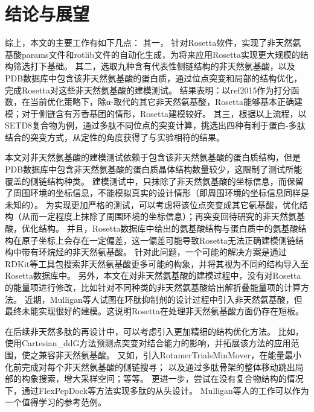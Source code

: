 
\chapter{结论与展望}


综上，本文的主要工作有如下几点：
其一， 针对Rosetta软件，实现了非天然氨基酸params文件和rotlib文件的自动化生成，为将来应用Rosetta实现更大规模的结构筛选打下基础。
其二，选取九种含有代表性侧链结构的非天然氨基酸，以及PDB数据库中包含该非天然氨基酸的蛋白质，通过位点突变和局部的结构优化，完成Rosetta对这些非天然氨基酸的建模测试。
结果表明：以ref2015作为打分函数，在当前优化策略下，除α-取代的其它非天然氨基酸，Rosetta能够基本正确建模；对于侧链含有芳香基团的情形，Rosetta建模较好。
其三，根据以上流程，以SETD8复合物为例，通过多肽不同位点的突变计算，挑选出四种有利于蛋白-多肽结合的突变方式，从定性的角度获得了与实验相符的结果。

本文对非天然氨基酸的建模测试依赖于包含该非天然氨基酸的蛋白质结构，但是PDB数据库中包含非天然氨基酸的蛋白质晶体结构数量较少，这限制了测试所能覆盖的侧链结构种类。
建模测试中，只抹除了非天然氨基酸的坐标信息，而保留了周围环境的坐标信息，不能模拟真实的设计情形（即周围环境的坐标信息同样是未知的）。
为实现更加严格的测试，可以考虑将该位点突变成其它氨基酸，优化结构（从而一定程度上抹除了周围环境的坐标信息）；再突变回待研究的非天然氨基酸，优化结构。
并且，Rosetta数据库中给出的氨基酸结构与蛋白质中的氨基酸结构在原子坐标上会存在一定偏差，这一偏差可能导致Rosetta无法正确建模侧链结构中带有环烷烃的非天然氨基酸。
针对此问题，一个可能的解决方案是通过RDKit等工具包搜索非天然氨基酸更多可能的构象，并将其视为不同的结构导入至Rosetta数据库中。
另外，本文在对非天然氨基酸的建模过程中，没有对Rosetta的能量项进行修改，比如针对不同种类的非天然氨基酸给出解折叠能量项的计算方法。
近期，Mulligan等人\cite{RN109}试图在环肽抑制剂的设计过程中引入非天然氨基酸，但最终未能实现很好的建模。这说明Rosetta在处理非天然氨基酸方面仍存在短板。

在后续非天然多肽的再设计中，可以考虑引入更加精细的结构优化方法。
比如，使用Cartesian\_ddG方法\cite{RN114}预测点突变对结合能力的影响，并拓展该方法的应用范围，使之兼容非天然氨基酸。
又如，引入RotamerTrialsMinMover\cite{RN110}，在能量最小化前完成对每个非天然氨基酸的侧链搜寻；
以及通过多肽骨架的整体移动跳出局部的构象搜索，增大采样空间；等等。
更进一步，尝试在没有复合物结构的情况下，通过FlexPepDock等\cite{RN115}方法实现多肽的从头设计。
Mulligan等人的工作可以作为一个值得学习的参考范例。
